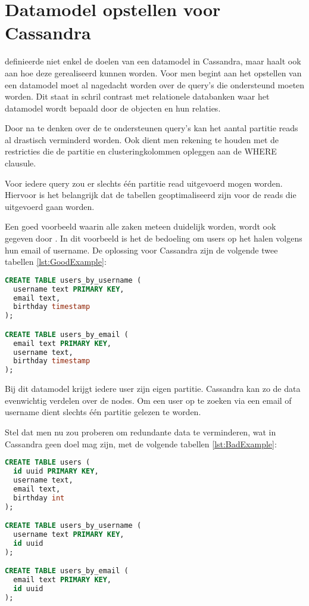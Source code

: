\section{Datamodel opstellen voor Cassandra}
\cite{Hobbs2015Datamodelling} definieerde niet enkel de doelen van een datamodel in Cassandra, maar haalt ook aan hoe deze gerealiseerd kunnen worden.
Voor men begint aan het opstellen van een datamodel moet al nagedacht worden over de query's die ondersteund moeten worden.
Dit staat in schril contrast met relationele databanken waar het datamodel wordt bepaald door de objecten en hun relaties.

Door na te denken over de te ondersteunen query's kan het aantal partitie reads al drastisch verminderd worden.
Ook dient men rekening te houden met de restricties die de partitie en clusteringkolommen opleggen aan de WHERE clausule.

Voor iedere query zou er slechts één partitie read uitgevoerd mogen worden.
Hiervoor is het belangrijk dat de tabellen geoptimaliseerd zijn voor de reads die uitgevoerd gaan worden.

Een goed voorbeeld waarin alle zaken meteen duidelijk worden, wordt ook gegeven door \cite{Hobbs2015Datamodelling} .
In dit voorbeeld is het de bedoeling om users op het halen volgens hun email of username.
De oplossing voor Cassandra zijn de volgende twee tabellen \ref{lst:GoodExample}:

\begin{lstlisting}[caption={Correcte modellering bij Cassandra},label={lst:GoodExample}, language=SQL]
CREATE TABLE users_by_username (
  username text PRIMARY KEY,
  email text,
  birthday timestamp
);

CREATE TABLE users_by_email (
  email text PRIMARY KEY,
  username text,
  birthday timestamp
);
\end{lstlisting}

Bij dit datamodel krijgt iedere user zijn eigen partitie.
Cassandra kan zo de data evenwichtig verdelen over de nodes.
Om een user op te zoeken via een email of username dient slechts één partitie gelezen te worden.

Stel dat men nu zou proberen om redundante data te verminderen, wat in Cassandra geen doel mag zijn, met de volgende tabellen \ref{lst:BadExample}:

\begin{lstlisting}[caption={Foutieve modellering bij Cassandra},label={lst:BadExample}, language=SQL]
CREATE TABLE users (
  id uuid PRIMARY KEY,
  username text,
  email text,
  birthday int
);

CREATE TABLE users_by_username (
  username text PRIMARY KEY,
  id uuid
);

CREATE TABLE users_by_email (
  email text PRIMARY KEY,
  id uuid
);
\end{lstlisting}

